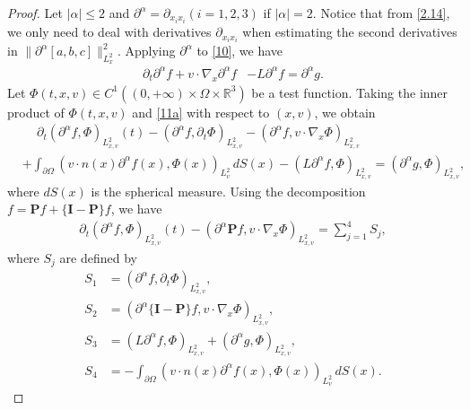 \documentclass[reqno,a4paper]{amsart}
\numberwithin{equation}{section}
\newcommand{\1}{\mathbf{1}}
\newcommand{\R}{\mathbb{R}}
\renewcommand{\P}{\mathbf{P}}
\newcommand{\pa}{\partial}
\newcommand{\<}{\langle}
\renewcommand{\>}{\rangle}
\newcommand{\I}{\mathbf{I}}
\renewcommand{\P}{\mathbf{P}}
\begin{document}
	\begin{proof}
		
		Let $|\alpha|\le 2$ and $\partial^\alpha=\partial_{x_ix_i}$$(i=1,2,3)$ if $|\alpha|=2$. Notice that from \eqref{2.14}, we only need to deal with derivatives $\partial_{x_ix_i}$ when estimating the second derivatives in $\|\pa^\alpha[{a},{b},{c}]\|^2_{L^2_{x}}$. Applying $\partial^\alpha$ to \eqref{10}, we have 
		\begin{align}\label{11a}
			\partial_t{\partial^\alpha f}+v\cdot\nabla_x{\partial^\alpha f} &- L {\partial^\alpha f} = {\partial^\alpha  g}.
		\end{align}	
		Let ${\Phi}(t,x,v)\in C^1((0,+\infty)\times\Omega\times\R^3)$ be a test function. Taking the inner product of ${\Phi}(t,x,v)$ and \eqref{11a} with respect to $(x,v)$,
we obtain 
		\begin{align*}
			&\quad\,\partial_t({\partial^\alpha f},{\Phi})_{L^2_{x,v}}(t)- ({\partial^\alpha f},\partial_t{\Phi})_{L^2_{x,v}}-({\partial^\alpha f},v\cdot{\nabla_{x}\Phi})_{L^2_{x,v}} 
			\\
			&+\int_{\partial\Omega}(v\cdot n(x){\partial^\alpha f}(x),{\Phi}(x))_{L^2_v}\,dS(x) - (L {\partial^\alpha f},{\Phi})_{L^2_{x,v}} = ({\partial^\alpha g},{\Phi})_{L^2_{x,v}},
		\end{align*}
	where $dS(x)$ is the spherical measure. 
		Using the decomposition ${f}=\P{f}+\{\I-\P\}{f}$, we have 
		\begin{align}\label{100}
			\partial_t({\partial^\alpha f},{\Phi})_{L^2_{x,v}}(t)-({\partial^\alpha \P f},v\cdot{\nabla_{x}\Phi})_{L^2_{x,v}}  = \sum_{j=1}^4S_j,
		\end{align}
		where $S_j$ are defined by 
		\begin{align*}
			 S_1 &= ({\partial^\alpha f},\partial_t{\Phi})_{L^2_{x,v}},\\
			S_2 &= ({\partial^\alpha \{\I-\P\}f},v\cdot{\nabla_{x}\Phi})_{L^2_{x,v}} ,\\
			S_3&= (L {\partial^\alpha f},{\Phi})_{L^2_{x,v}}+({\partial^\alpha g},{\Phi})_{L^2_{x,v}},\\
			S_4 &= -\int_{\partial\Omega}(v\cdot n(x){\partial^\alpha f}(x),{\Phi}(x))_{L^2_v}\,dS(x).
		\end{align*}
		
		
		

\end{proof}
\end{document}
